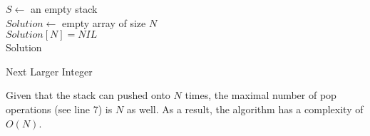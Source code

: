\begin{algorithm}[H]
\SetAlgoLined
{}
$S \gets $ an empty stack \\
$Solution \gets $ empty array of size $N$ \\
$Solution[N] = NIL$ \\
\Return Solution
\caption{Next Larger Integer}
\end{algorithm}

Given that the stack can pushed onto $N$ times, the maximal number of pop operations (see line 7) is $N$ as well. As a result, the algorithm has a complexity of $O(N)$.